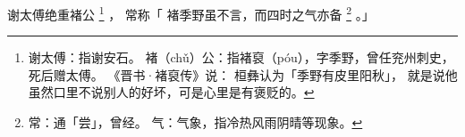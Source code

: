 
\switchcolumn*[\section{}]

谢太傅绝重褚公%
\footnote{%
    谢太傅：指谢安石。
    褚（chǔ）公：指褚裒（póu），字季野，曾任兖州刺史，死后赠太傅。
            《晋书·褚裒传》说：
            桓彝认为「季野有皮里阳秋」，
            就是说他虽然口里不说别人的好坏，可是心里是有褒贬的。
}%
，
常称「
    褚季野虽不言，而四时之气亦备%
    \footnote{%
        常：通「尝」，曾经。
        气：气象，指冷热风雨阴晴等现象。
    }%
。」

\switchcolumn


